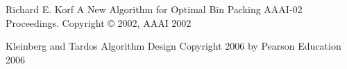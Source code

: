 \documentclass[11pt]{article}
\theoremstyle{definition}
\begin{document}
\begin{lstlisting}
\end{lstlisting}


\begin{thebibliography}{9}
	Richard E. Korf
	A New Algorithm for Optimal Bin Packing
	AAAI-02 Proceedings. Copyright © 2002, AAAI
	2002

    Kleinberg and Tardos
    Algorithm Design
    Copyright 2006 by Pearson Education
    2006
\end{thebibliography}
\end{document}
